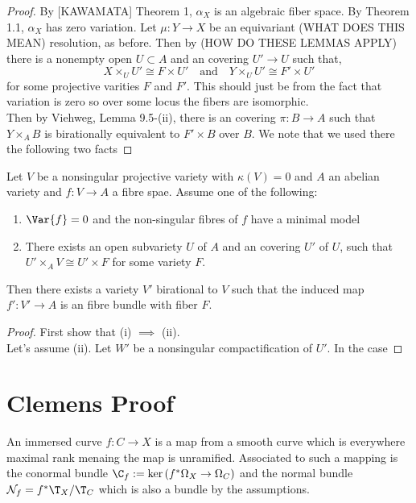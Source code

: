 \documentclass[12pt]{article}
\begin{document}
\begin{proof}
By [KAWAMATA] Theorem 1, $\alpha_X$ is an algebraic fiber space. By Theorem 1.1, $\alpha_X$ has zero variation. Let $\mu : Y \to X$ be an equivariant (WHAT DOES THIS MEAN) resolution, as before. Then by (HOW DO THESE LEMMAS APPLY) there is a nonempty open $U \subset A$ and an \etale covering $U' \to U$ such that,
\[ X \times_U U' \cong F \times U' \quad \text{and} \quad Y \times_U U' \cong F' \times U' \]
for some projective varities $F$ and $F'$. This should just be from the fact that variation is zero so over some locus the fibers are isomorphic. 
\bigskip\\
Then by Viehweg, Lemma 9.5-(ii), there is an \etale covering $\pi : B \to A$ such that $Y \times_A B$ is birationally equivalent to $F' \times B$ over $B$. We note that we used there the following two facts
\end{proof}

\begin{lemma}
Let $V$ be a nonsingular projective variety with $\kappa(V) = 0$ and $A$ an abelian variety and $f : V \to A$ a fibre spae. Assume one of the following:
\begin{enumerate}
\item $\Var{f} = 0$ and the non-singular fibres of $f$ have a minimal model
\item There exists an open subvariety $U$ of $A$ and an \etale covering $U'$ of $U$, such that $U' \times_A V \cong U' \times F$ for some variety $F$.
\end{enumerate}
Then there exists a variety $V'$ birational to $V$ such that the induced map $f' : V' \to A$ is an \etale fibre bundle with fiber $F$.
\end{lemma}

\begin{proof}
First show that (i) $\implies$ (ii).
\bigskip\\
Let's assume (ii). Let $W'$ be a nonsingular compactification of $U'$. In the case
\end{proof}

\section{Clemens Proof}

\newcommand{\cN}{\mathcal{N}}

\begin{defn}
An immersed curve $f : C \to X$ is a map from a smooth curve which is everywhere maximal rank menaing the map is unramified. Associated to such a mapping is the conormal bundle $\C_f := \ker{(f^* \Omega_X \to \Omega_C)}$ and the normal bundle $\cN_f = f^* \T_X / \T_C$ which is also a bundle by the assumptions.
\end{defn}
\end{document}
